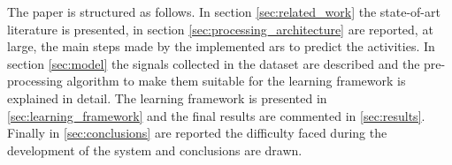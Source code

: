 The paper is structured as follows. In section \ref{sec:related_work} the state-of-art literature is presented, in section \ref{sec:processing_architecture} are reported, at large, the main steps made by the implemented \gls{ars} to predict the activities.
In section \ref{sec:model} the signals collected in the dataset are described and the pre-processing algorithm to make them suitable for the learning framework is explained in detail.
The learning framework is presented in \ref{sec:learning_framework} and the final results are commented in \ref{sec:results}.
Finally in \ref{sec:conclusions} are reported the difficulty faced during the development of the system and conclusions are drawn.
